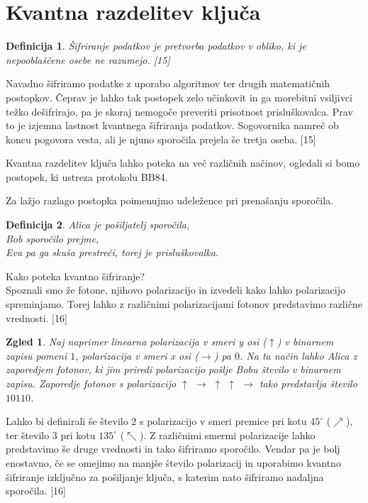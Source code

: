 \documentclass[A4paper, 11pt]{article}
\newtheorem{definicija}{Definicija}
\newtheorem{zgled}{Zgled}
\begin{document}

\section{Kvantna razdelitev ključa}

\begin{definicija}
Šifriranje podatkov je pretvorba podatkov v obliko, ki je nepooblaščene osebe ne razumejo. [15]
\end{definicija}

Navadno šifriramo podatke z uporabo algoritmov ter drugih matematičnih postopkov. Čeprav je lahko tak postopek zelo učinkovit in ga morebitni vsiljivci težko dešifrirajo, pa je skoraj nemogoče preveriti prisotnost prisluškovalca. Prav to je izjemna lastnost kvantnega šifriranja podatkov. Sogovornika namreč ob koncu pogovora vesta, ali je njuno sporočila prejela še tretja oseba. [15]

Kvantna razdelitev ključa lahko poteka na več različnih načinov, ogledali si bomo postopek, ki ustreza protokolu BB84.

Za lažjo razlago postopka poimenujmo udeležence pri prenašanju sporočila.

\begin{definicija}
Alica je pošiljatelj sporočila,\\
Bob sporočilo prejme,\\
Eva pa ga skuša prestreči, torej je prisluškovalka.
\end{definicija}

Kako poteka kvantno šifriranje?\\
Spoznali smo že fotone, njihovo polarizacijo in izvedeli kako lahko polarizacijo spreminjamo. Torej lahko z različnimi polarizacijami fotonov predstavimo različne vrednosti. [16]

\begin{zgled}
Naj naprimer linearna polarizacija v smeri y osi ($\uparrow$) v binarnem zapisu pomeni $1$, polarizacija v smeri x osi ($\rightarrow$) pa $0$. Na ta način lahko Alica z zaporedjem fotonov, ki jim priredi polarizacijo pošlje Bobu število v binarnem zapisu. Zaporedje fotonov s polarizacijo $\uparrow$ $\rightarrow$ $\uparrow$ $\uparrow$ $\rightarrow$ tako predstavlja število $1 0 1 1 0$.
\end{zgled}

Lahko bi definirali še število $2$ s polarizacijo v smeri premice pri kotu $45^{\circ}$ ($\nearrow$), ter število $3$ pri kotu $135^{\circ}$ ($\nwarrow$). Z različnimi smermi polarizacije lahko predstavimo še druge vrednosti in tako šifriramo sporočilo. Vendar pa je bolj enostavno, če se omejimo na manjše število polarizacij in uporabimo kvantno šifriranje izključno za pošiljanje ključa, s katerim nato šifriramo nadaljna sporočila. [16]
\end{document}
